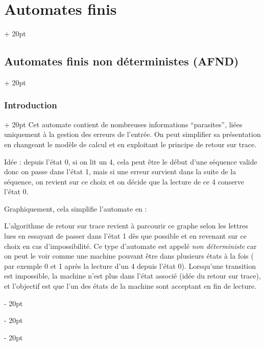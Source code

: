 \documentclass[a4paper, 12pt, twoside]{article}
\newcommand{\ind}[1][20pt]{\advance\leftskip + #1}
\newcommand{\deind}[1][20pt]{\advance\leftskip - #1}
\newenvironment{indt}[2][20pt]{#2 \par \ind[#1]}{\par \deind} %
\begin{document}
\begin{indt}{\section{Automates finis}}
\begin{indt}{\subsection{Automates finis non déterministes (AFND)}}
\begin{indt}{\subsubsection{Introduction}}
                Cet automate contient de nombreuses informations ``parasites'', liées uniquement à la gestion des erreurs de l'entrée. On peut simplifier sa présentation en changeant le modèle de calcul et en exploitant le principe de retour sur trace.

                Idée : depuis l'état 0, si on lit un 4, cela peut être le début d'une séquence valide donc on passe dans l'état 1, mais si une erreur survient dans la suite de la séquence, on revient sur ce choix et on décide que la lecture de ce 4 conserve l'état 0.

                Graphiquement, cela simplifie l'automate en :

                \begin{center}
                \end{center}

                L'algorithme de retour sur trace revient à parcourir ce graphe selon les lettres lues en essayant de passer dans l'état 1 dès que possible et en revenant sur ce choix en cas d'impossibilité.
                Ce type d'automate est appelé \emph{non déterministe} car on peut le voir comme une machine pouvant être dans plusieurs états à la fois ( par exemple 0 et 1 après la lecture d'un 4 depuis l'état 0).
                Lorsqu'une transition est impossible, la machine n'est plus dans l'état associé (idée du retour sur trace), et l'objectif est que l'un des états de la machine sont acceptant en fin de lecture.
            \end{indt}

            \vspace{12pt}
            

\end{indt}
\end{indt}
\end{document}
